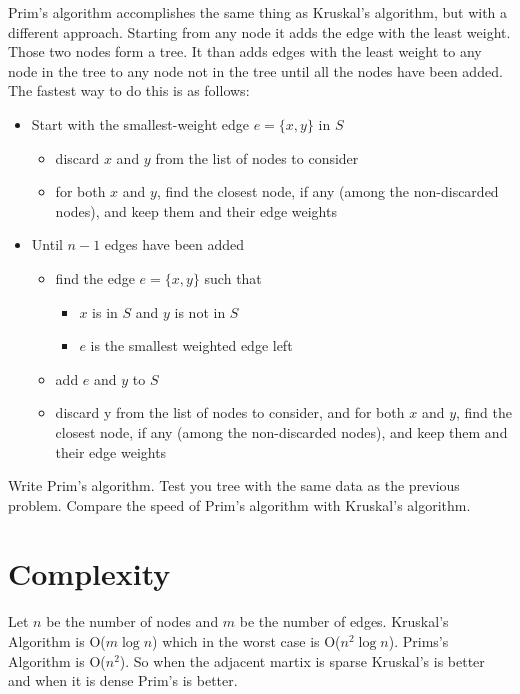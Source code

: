Prim's algorithm accomplishes the same thing as Kruskal's algorithm, but with a different approach. Starting from any node it adds the edge with the least weight. Those two nodes form a tree. It than adds edges with the least weight to any node in the tree to any node not in the tree until all the nodes have been added. The fastest way to do this is as follows:
\flushleft
\begin{itemize}
\item Start with the smallest-weight edge $e = \{x, y\}$ in $S$
\begin{itemize}
\item discard $x$ and $y$ from the list of nodes to consider
\item for both $x$ and $y$, find the closest node, if any (among the non-discarded nodes), and keep them and their edge weights
\end{itemize}
\item Until $n-1$ edges have been added
\begin{itemize}
\item find the edge $e = \{x, y\}$ such that
\begin{itemize}
\item $x$ is in $S$ and $y$ is not in $S$
\item $e$ is the smallest weighted edge left
\end{itemize}
\item add $e$ and $y$ to $S$
\item discard y from the list of nodes to consider, and for both $x$ and $y$, find the closest node, if any (among the non-discarded nodes), and keep them and their edge weights
\end{itemize}
\end{itemize}

\begin{problem}
Write Prim's algorithm. Test you tree with the same data as the previous problem. Compare the speed of Prim's algorithm with Kruskal's algorithm. 
\end{problem}

\section*{Complexity}
Let $n$ be the number of nodes and $m$ be the number of edges. Kruskal's Algorithm is O($m\log{n}$) which in the worst case is O($n^2\log{n}$). Prims's Algorithm is O($n^2$). So when the adjacent martix is sparse Kruskal's is better and when it is dense Prim's is better. 